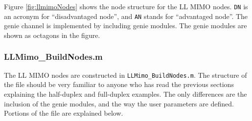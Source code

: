 Figure \ref{fig:llmimoNodes} shows the node structure for the LL
MIMO nodes.%
\verb+DN+ is an acronym for ``disadvantaged node'', and \verb+AN+ stands for ``advantaged node''.  The genie channel is implemented by including genie
modules. The genie modules are shown as octagons in the figure.

\subsubsection{LLMimo\_BuildNodes.m}

The LL MIMO nodes are constructed in
\verb+LLMimo_BuildNodes.m+.  The structure of the file
should be very familiar to anyone who has read the previous sections
explaining the half-duplex and full-duplex examples.  The only
differences are the inclusion of the genie modules, and the way the
user parameters are defined.  Portions of the file are explained below.

